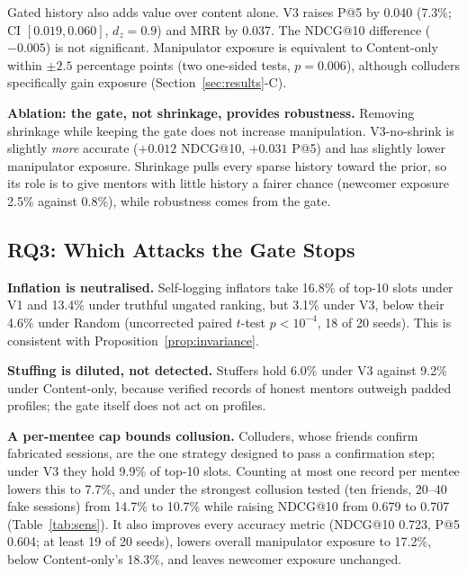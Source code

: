 \documentclass[conference]{IEEEtran}
\begin{document}
Gated history also adds value over content alone. V3 raises P@5 by 0.040 (7.3\%; CI $[0.019,0.060]$, $d_z=0.9$) and MRR by 0.037. The NDCG@10 difference ($-0.005$) is not significant. Manipulator exposure is equivalent to Content-only within $\pm2.5$ percentage points (two one-sided tests, $p=0.006$), although colluders specifically gain exposure (Section~\ref{sec:results}-C).

\textbf{Ablation: the gate, not shrinkage, provides robustness.} Removing shrinkage while keeping the gate does not increase manipulation. V3-no-shrink is slightly \emph{more} accurate ($+0.012$ NDCG@10, $+0.031$ P@5) and has slightly lower manipulator exposure. Shrinkage pulls every sparse history toward the prior, so its role is to give mentors with little history a fairer chance (newcomer exposure 2.5\% against 0.8\%), while robustness comes from the gate.

\subsection{RQ3: Which Attacks the Gate Stops}
\textbf{Inflation is neutralised.} Self-logging inflators take 16.8\% of top-10 slots under V1 and 13.4\% under truthful ungated ranking, but 3.1\% under V3, below their 4.6\% under Random (uncorrected paired $t$-test $p<10^{-4}$, 18 of 20 seeds). This is consistent with Proposition~\ref{prop:invariance}.

\textbf{Stuffing is diluted, not detected.} Stuffers hold 6.0\% under V3 against 9.2\% under Content-only, because verified records of honest mentors outweigh padded profiles; the gate itself does not act on profiles.

\textbf{A per-mentee cap bounds collusion.} Colluders, whose friends confirm fabricated sessions, are the one strategy designed to pass a confirmation step; under V3 they hold 9.9\% of top-10 slots. Counting at most one record per mentee lowers this to 7.7\%, and under the strongest collusion tested (ten friends, 20--40 fake sessions) from 14.7\% to 10.7\% while raising NDCG@10 from 0.679 to 0.707 (Table~\ref{tab:sens}). It also improves every accuracy metric (NDCG@10 0.723, P@5 0.604; at least 19 of 20 seeds), lowers overall manipulator exposure to 17.2\%, below Content-only's 18.3\%, and leaves newcomer exposure unchanged.
\end{document}
